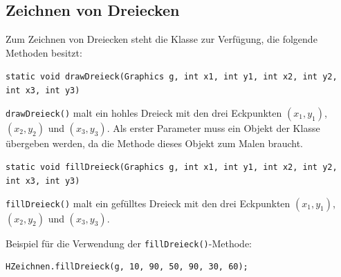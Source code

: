 \subsection{Zeichnen von Dreiecken}

Zum Zeichnen von Dreiecken steht die Klasse  zur Verfügung,
die folgende Methoden besitzt:

\begin{compactitem}
\item
\lstinline|static void drawDreieck(Graphics g, int x1, int y1, int x2, int y2, int x3, int y3)| 

\lstinline|drawDreieck()| malt ein hohles Dreieck mit den drei Eckpunkten $(x_1, y_1)$,
$(x_2, y_2)$ und $(x_3, y_3)$. Als erster Parameter muss ein Objekt der
Klasse  übergeben werden, da die Methode dieses Objekt zum
Malen braucht.
\item
\lstinline|static void fillDreieck(Graphics g, int x1, int y1, int x2, int y2, int x3, int y3)|

\lstinline|fillDreieck()| malt ein gefülltes Dreieck mit den drei Eckpunkten $(x_1, y_1)$,
$(x_2, y_2)$ und $(x_3, y_3)$.
\end{compactitem}

Beispiel für die Verwendung der \lstinline|fillDreieck()|-Methode:

\begin{lstlisting}
HZeichnen.fillDreieck(g, 10, 90, 50, 90, 30, 60);
\end{lstlisting}
